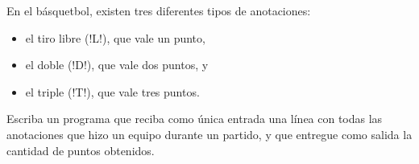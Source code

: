 En el básquetbol,
existen tres diferentes tipos de anotaciones:
\begin{itemize}
  \item el tiro libre (\li!L!), que vale un punto,
  \item el doble (\li!D!), que vale dos puntos, y
  \item el triple (\li!T!), que vale tres puntos.
\end{itemize}

Escriba un programa que reciba como única entrada
una línea con todas las anotaciones que hizo un equipo durante un partido,
y que entregue como salida la cantidad de puntos obtenidos.

\begin{minipage}[t]{.50\textwidth}
  
\end{minipage}
